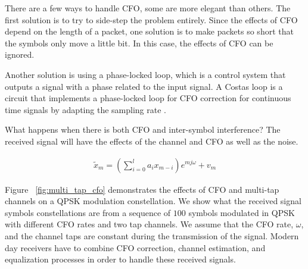 There are a few ways to handle CFO, some are more elegant than others. 
The first solution is to try to side-step the problem entirely.  
Since the effects of CFO depend on the length of a packet, one solution is to make packets so short that the symbols only move a little bit.  In this case, the effects of CFO can be ignored.

Another solution is using a phase-locked loop, which is a control system that outputs a signal with a phase related to the input signal.  
A Costas loop is a circuit that implements a phase-locked loop for CFO correction for continuous time signals by adapting the sampling rate \cite{costas}.

What happens when there is both CFO and inter-symbol interference?  The received signal will have the effects of the channel and CFO as well as the noise. 

\begin{align}
\tilde{x}_m = (\sum_{i=0}^l a_i x_{m-i})e^{mj\omega} + v_m
\end{align}

Figure ~\ref{fig:multi_tap_cfo} demonstrates the effects of CFO and multi-tap channels on a QPSK modulation constellation. 
We show what the received signal symbols constellations are from a sequence of $100$ symbols modulated in QPSK with different CFO rates and two tap channels.  We assume that the CFO rate, $\omega$, and the channel taps are constant during the transmission of the signal.  
Modern day receivers have to combine CFO correction, channel estimation, and equalization processes in order to handle these received signals.

